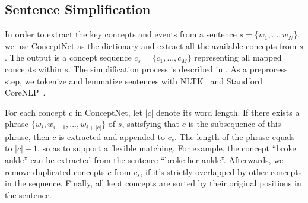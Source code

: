 \subsection{Sentence Simplification}
\label{sec:sentence simplification}





In order to extract the key concepts and events from a sentence
$s = \{w_1, ..., w_N\}$,
we use ConceptNet as the dictionary
and extract all the available concepts from $s$.
The output is a concept sequence $c_s = \{c_1, ..., c_M\}$
representing all mapped concepts within $s$.
The simplification process is described in .
As a preprocess step, we tokenize and lemmatize sentences with
NLTK~\cite{loper2002nltk} and Standford CoreNLP~\cite{manning2014stanford}.

For each concept $c$ in ConceptNet, let $|c|$ denote its word length.
If there exists a phrase $\{w_i, w_{i+1}, ..., w_{i+|c|}\}$ of $s$,
satisfying that $c$ is the subsequence of this phrase,
then $c$ is extracted and appended to $c_s$.
The length of the phrase equals to $|c|+1$,
so as to support a flexible matching.
For example, the concept ``broke ankle'' can be extracted
from the sentence ``broke her ankle''.
Afterwards, we remove duplicated concepts $c$ from $c_s$,
if it's strictly overlapped by other concepts in the sequence.
Finally, all kept concepts are sorted by their original positions
in the sentence.



